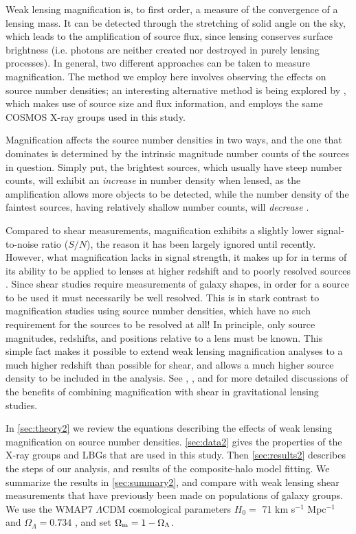 Weak lensing magnification is, to first order, a measure of the convergence of a lensing mass. It can be detected through the stretching of solid angle on the sky, which leads to the amplification of source flux, since lensing conserves surface brightness (i.e. photons are neither created nor destroyed in purely lensing processes). In general, two different approaches can be taken to measure magnification. The method we employ here involves observing the effects on source number densities; an interesting alternative method is being explored by \citet{Schmidt12}, which makes use of source size and flux information, and employs the same \ac{COSMOS} X-ray groups used in this study.

Magnification affects the source number densities in two ways, and the one that dominates is determined by the intrinsic magnitude number counts of the sources in question. Simply put, the brightest sources, which usually have steep number counts, will exhibit an {\it increase} in number density when lensed, as the amplification allows more objects to be detected, while the number density of the faintest sources, having relatively shallow number counts, will {\it decrease} \citep{Narayan89}.

Compared to shear measurements, magnification exhibits a slightly lower signal-to-noise ratio ($S/N$), the reason it has been largely ignored until recently. However, what magnification lacks in signal strength, it makes up for in terms of its ability to be applied to lenses at higher redshift and to poorly resolved sources \citep{Waerbeke10}. Since shear studies require measurements of galaxy shapes, in order for a source to be used it must necessarily be well resolved. This is in stark contrast to magnification studies using source number densities, which have no such requirement for the sources to be resolved at all! In principle, only source magnitudes, redshifts, and positions relative to a lens must be known. This simple fact makes it possible to extend weak lensing magnification analyses to a much higher redshift than possible for shear, and allows a much higher source density to be included in the analysis.  See \citet{Waerbeke10}, \citet{RozoSchmidt10}, and \citet{Umetsu11} for more detailed discussions of the benefits of combining magnification with shear in gravitational lensing studies. 

In \autoref{sec:theory2} we review the equations describing the effects of weak lensing magnification on source number densities.  \autoref{sec:data2} gives the properties of the X-ray groups and \ac{LBG}s that are used in this study.  Then \autoref{sec:results2} describes the steps of our analysis, and results of the composite-halo model fitting.  We summarize the results in \autoref{sec:summary2}, and compare with weak lensing shear measurements that have previously been made on populations of galaxy groups.  We use the WMAP7 $\Lambda$CDM cosmological parameters $H_0 =$ 71 km s$^{-1}$ Mpc$^{-1}$ and $\Omega_{\Lambda} = 0.734$ \citep{WMAP7}, and set $\Omega_{\rm m} = 1 - \Omega_{\Lambda}$.


